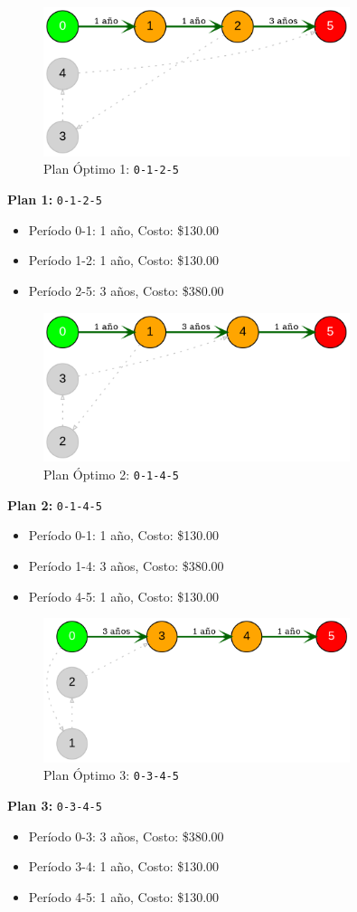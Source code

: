 \documentclass[12pt]{article}
\begin{document}
\begin{figure}[H]
\centering
\includegraphics[width=0.8\textwidth]{REporteRe1_plan_1.png}
\caption{Plan Óptimo 1: \texttt{0-1-2-5}}
\label{fig:plan1}
\end{figure}

\textbf{Plan 1:} \texttt{0-1-2-5}
\begin{itemize}\small
\item Período 0-1: 1 año, Costo: \$130.00
\item Período 1-2: 1 año, Costo: \$130.00
\item Período 2-5: 3 años, Costo: \$380.00
\end{itemize}

\begin{figure}[H]
\centering
\includegraphics[width=0.8\textwidth]{REporteRe1_plan_2.png}
\caption{Plan Óptimo 2: \texttt{0-1-4-5}}
\label{fig:plan2}
\end{figure}

\textbf{Plan 2:} \texttt{0-1-4-5}
\begin{itemize}\small
\item Período 0-1: 1 año, Costo: \$130.00
\item Período 1-4: 3 años, Costo: \$380.00
\item Período 4-5: 1 año, Costo: \$130.00
\end{itemize}

\begin{figure}[H]
\centering
\includegraphics[width=0.8\textwidth]{REporteRe1_plan_3.png}
\caption{Plan Óptimo 3: \texttt{0-3-4-5}}
\label{fig:plan3}
\end{figure}

\textbf{Plan 3:} \texttt{0-3-4-5}
\begin{itemize}\small
\item Período 0-3: 3 años, Costo: \$380.00
\item Período 3-4: 1 año, Costo: \$130.00
\item Período 4-5: 1 año, Costo: \$130.00
\end{itemize}
\end{document}
